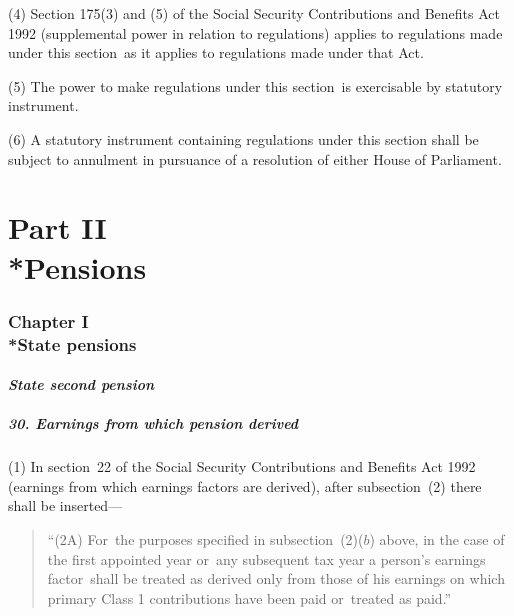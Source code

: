 \documentclass[12pt,a4paper]{article}
\begin{document}
(4) Section 175(3)  and (5)  of the Social Security Contributions and Benefits Act 1992 (supplemental power in relation to regulations) applies to regulations made under this section~as it applies to regulations made under that Act.

(5) The power to make regulations under this section~is exercisable by statutory instrument.

(6) A statutory instrument containing regulations under this section shall be subject to annulment in pursuance of a resolution of either House of Parliament.

\vfill


\part[Part II --- Pensions]{Part II\\*Pensions}


\section[Chapter I --- State pensions]{Chapter I\\*State pensions}

\renewcommand\parthead{--- Part II Chapter I}

\subsection{\itshape State second pension}

\subsubsection{30. Earnings from which pension derived}

(1) In section~22 of the Social Security Contributions and Benefits Act 1992 (earnings from which earnings factors are derived), after subsection~(2)  there shall be inserted—
\begin{quotation}
“(2A) For~the purposes specified in subsection~(2)($b$)  above, in the case of the first appointed year or~any subsequent tax year a person’s earnings factor~shall be treated as derived only from those of his earnings on which primary Class 1 contributions have been paid or~treated as paid.”
\end{quotation}
\end{document}
